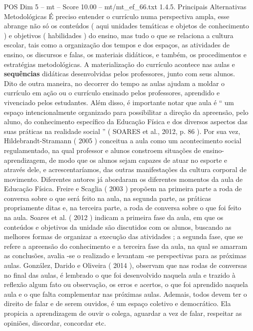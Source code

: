 \begin{textsample}{POS Dim 5 – mt – Score 10.00 – mt/mt\_ef\_66.txt}  \label{ex:f5_pos_084}
1.4.5.
Principais Alternativas Metodológicas É preciso entender o currículo numa perspectiva ampla, esse abrange não só os conteúdos ( aqui unidades temáticas e objetos de conhecimento ) e objetivos ( habilidades ) do ensino, mas tudo o que se relaciona a cultura escolar, tais como a organização dos tempos e dos espaços, as atividades de ensino, os discursos e falas, os materiais didáticos, e também, os procedimentos e estratégias metodológicas.
A materialização do currículo acontece nas aulas e \textbf{sequências} didáticas desenvolvidas pelos professores, junto com seus alunos.
Dito de outra maneira, no decorrer do tempo as aulas ajudam a moldar o currículo em ação ou o currículo ensinado pelos professores, aprendido e vivenciado pelos estudantes.
Além disso, é importante notar que aula é “ um espaço intencionalmente organizado para possibilitar a direção da apreensão, pelo aluno, do conhecimento específico da Educação Física e dos diversos aspectos das suas práticas na realidade social ” ( SOARES et al., 2012, p. 86 ).
Por sua vez, Hildebrandt-Stramann ( 2005 ) conceitua a aula como um acontecimento social regulamentado, na qual professor e alunos constroem situações de ensino-aprendizagem, de modo que os alunos sejam capazes de atuar no esporte e através dele, e acrescentaríamos, das outras manifestações da cultura corporal de movimento.
Diferentes autores já abordaram os diferentes momentos da aula de Educação Física.
Freire e Scaglia ( 2003 ) propõem na primeira parte a roda de conversa sobre o que será feito na aula, na segunda parte, as práticas propriamente ditas e, na terceira parte, a roda de conversa sobre o que foi feito na aula.
Soares et al. ( 2012 ) indicam a primeira fase da aula, em que os conteúdos e objetivos da unidade são discutidos com os alunos, buscando as melhores formas de organizar a execução das atividades ; a segunda fase, que se refere a apreensão do conhecimento e a terceira fase da aula, na qual se amarram as conclusões, avalia -se o realizado e levantam -se perspectivas para as próximas aulas.
González, Darido e Oliveira ( 2014 ), observam que nas rodas de conversas no final das aulas, é lembrado o que foi desenvolvido naquela aula e trazido à reflexão algum fato ou observação, os erros e acertos, o que foi aprendido naquela aula e o que falta complementar nas próximas aulas.
Ademais, todos devem ter o direito de falar e de serem ouvidos, é um espaço coletivo e democrático.
Ela propicia a aprendizagem de ouvir o colega, aguardar a vez de falar, respeitar as opiniões, discordar, concordar etc.

\end{textsample}
